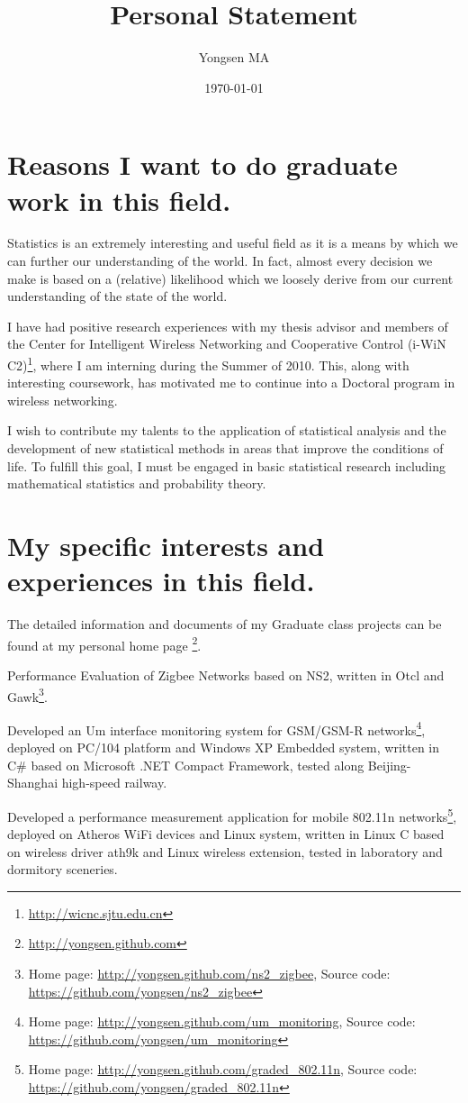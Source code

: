 \documentclass{article}
\title{Personal Statement}
\author{Yongsen MA}
\date{\today}
\begin{document}
\maketitle%

\section{Reasons I want to do graduate work in this field.}
Statistics is an extremely interesting and useful field as it is a means by which we can further our understanding of the world. In fact, almost every decision we make is based on a (relative) likelihood which we loosely derive from our current understanding of the state of the world.

I have had positive research experiences with my thesis advisor and members of the Center for Intelligent Wireless Networking and Cooperative Control (i-WiN C2)\footnote{\url{http://wicnc.sjtu.edu.cn}}, where I am interning during the Summer of 2010. This, along with interesting coursework, has motivated me to continue into a Doctoral program in wireless networking.

I wish to contribute my talents to the application of statistical analysis and the development of new statistical methods in areas that improve the conditions of life. To fulﬁll this goal, I must be engaged in basic statistical research including mathematical statistics and probability theory.

\section{My specific interests and experiences in this field.}
The detailed information and documents of my Graduate class projects can be found at my personal home page \footnote{\url{http://yongsen.github.com}}.

Performance Evaluation of Zigbee Networks based on NS2, written in Otcl and Gawk\footnote{Home page: \url{http://yongsen.github.com/ns2_zigbee}, Source code: \url{https://github.com/yongsen/ns2_zigbee}}.


Developed an Um interface monitoring system for GSM/GSM-R networks\footnote{Home page: \url{http://yongsen.github.com/um_monitoring}, Source code: \url{https://github.com/yongsen/um_monitoring}}, deployed on PC/104
platform and Windows XP Embedded system, written in C\# based on Microsoft .NET Compact Framework, tested along Beijing-Shanghai high-speed railway.

Developed a performance measurement application for mobile 802.11n networks\footnote{Home page: \url{http://yongsen.github.com/graded_802.11n}, Source code: \url{https://github.com/yongsen/graded_802.11n}}, deployed on Atheros WiFi devices and Linux system, written in Linux C based on wireless driver ath9k and Linux wireless extension, tested in laboratory and dormitory sceneries.
\end{document}
